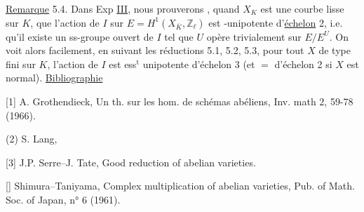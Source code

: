 \uline{Remarque} 5.4. Dans Exp \uline{III}, nous prouverons \unsure{$=$|$\simeq$}, quand $X_K$ est une courbe   lisse sur $K$, que l'action de $I$ sur $E=H^1(X_{\bar K},\mathbb Z_\ell)$ est -unipotente d'\uline{échelon} 2, i.e. qu'il existe un ss-groupe ouvert   de $I$ tel que  $U$ opère  trivialement sur  $E/E^U$.
On voit alors facilement, en suivant les réductions 5.1, 5.2, 5.3,  pour tout  $X$  de type fini sur $K$, l'action de $I$ est  ess$^{\mathrm t}$ unipotente d'échelon 3 (et $=$ d'échelon 2  si $X$ est normal).
\uline{Bibliographie}

[1] A. Grothendieck, Un th. sur les hom. de schémas abéliens, Inv. math 2, 59-78 (1966).

(2) S. Lang,

[3] J.P. Serre--J. Tate, Good reduction of abelian varieties.

[] Shimura--Taniyama, Complex multiplication of abelian varieties, Pub. of Math. Soc. of Japan, n° 6 (1961).
